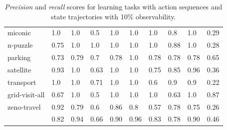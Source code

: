 \begin{table}[hbt!]
\begin{center}
\begin{footnotesize}
\begin{tabular}{l|l|l|l|l|l|l||l|l||l|}
				miconic & 1.0 & 1.0 & 0.5 & 1.0 & 1.0 & 1.0 & 0.8 & 1.0& 0.29 \\ %
				n-puzzle & 0.75 & 1.0 & 1.0 & 1.0 & 1.0 & 1.0 & 0.88 & 1.0& 0.28 \\ %
				parking & 0.73 & 0.79 & 0.7 & 0.78 & 1.0 & 0.78 & 0.78 & 0.78& 0.65 \\ %
				satellite & 0.93 & 1.0 & 0.63 & 1.0 & 1.0 & 0.75 & 0.85 & 0.96& 0.36 \\ %
				transport & 1.0 & 1.0 & 0.71 & 1.0 & 1.0 & 0.6 & 0.9 & 0.9& 0.22 \\ %
				grid-visit-all & 0.67 & 1.0 & 0.5 & 1.0 & 1.0 & 1.0 & 0.63 & 1.0& 0.87 \\ %
				zeno-travel & 0.92 & 0.79 & 0.6 & 0.86 & 0.8 & 0.57 & 0.78 & 0.75& 0.26 \\ %
				\hline
				\bf & 0.82 & 0.94 & 0.66 & 0.90 & 0.96 & 0.83 & 0.78 & 0.90 & 0.46 \\
			\end{tabular}
                  \end{footnotesize}			
		\end{center}
	\caption{\small {\em Precision} and {\em recall} scores for learning tasks with \FO action sequences and \PO state trajectories with 10\% observability.}
	\label{tab:results_minimum_100_10}
\end{table}

